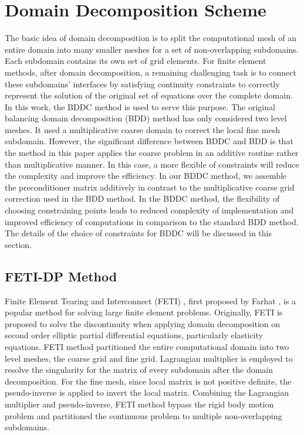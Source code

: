 \section{Domain Decomposition Scheme}
The basic idea of domain decomposition is to split the computational mesh of an entire domain into many smaller meshes for a set of non-overlapping subdomains. Each subdomain contains its own set of grid elements. For finite element methods, after domain decomposition, a remaining challenging task is to connect these subdomains' interfaces by satisfying continuity constraints to correctly represent the solution of the original set of equations over the complete domain. In this work, the BDDC method is used to serve this purpose. The original balancing domain decomposition (BDD) method \cite{mandel1993balancing} has only considered two level meshes. It used a multiplicative coarse domain to correct the local fine mesh subdomain. However, the significant difference between BDDC and BDD is that the method in this paper applies the coarse problem in an additive routine rather than multiplicative manner. In this case, a more flexible of constraints will reduce the complexity and improve the efficiency. In our BDDC method, we assemble the preconditioner matrix additively in contrast to the multiplicative coarse grid correction used in the BDD method. In the BDDC method, the flexibility of choosing constraining points leads to reduced complexity of implementation and improved efficiency of computations in comparison to the standard BDD method. The details of the choice of constraints for BDDC will be discussed in this section.

\subsection{FETI-DP Method}
Finite Element Tearing and Interconnect (FETI) , first proposed by Farhat \cite{farhat1991method, farhat1994optimal, klawonn2001feti, farhat1998two, li2006feti, klawonn2006dual}, is a popular method for solving large finite element problems. Originally, FETI is proposed to solve the discontinuity when applying domain decomposition on second order elliptic partial differential equations, particularly  elasticity equations. FETI method partitioned the entire computational domain into two level meshes, the coarse grid and fine grid. Lagrangian multiplier is employed to resolve the singularity for the matrix of every subdomain after the domain decomposition. For the fine mesh, since local matrix is not positive definite, the pseudo-inverse is applied to invert the local matrix. Combining the Lagrangian multiplier and pseudo-inverse, FETI method bypass the rigid body motion problem and partitioned the continuous problem to multiple non-overlapping subdomains.

